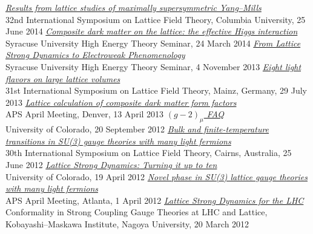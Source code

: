 \begin{spacelistout}
\begin{revnumerate}
    \pagebreakitem
      \textit{\href{http://www.davidschaich.net/talks/lattice14.pdf}{Results from lattice studies of maximally supersymmetric Yang--Mills}} \\
      32nd International Symposium on Lattice Field Theory, Columbia University, 25 June 2014
    \pagebreakitem
      \textit{\href{http://www.davidschaich.net/talks/LSD_SU4_1403.pdf}{Composite dark matter on the lattice: the effective Higgs interaction}} \\
      Syracuse University High Energy Theory Seminar, 24 March 2014
    \pagebreakitem
      \textit{\href{http://www.davidschaich.net/talks/LSD_EFT13.pdf}{From Lattice Strong Dynamics to Electroweak Phenomenology}} \\
      Syracuse University High Energy Theory Seminar, 4 November 2013
    \pagebreakitem
      \textit{\href{http://www.davidschaich.net/talks/lattice13.pdf}{Eight light flavors on large lattice volumes}} \\ %
      31st International Symposium on Lattice Field Theory, Mainz, Germany, 29 July 2013
    \pagebreakitem
      \textit{\href{http://www.davidschaich.net/talks/April13.pdf}{Lattice calculation of composite dark matter form factors}} \\
      APS April Meeting, Denver, 13 April 2013
    \pagebreakitem
      \textit{\href{http://www.davidschaich.net/talks/g-2_1209.pdf}{$(g - 2)_{\mu}$ FAQ}} \\
      University of Colorado, 20 September 2012
    \pagebreakitem
      \textit{\href{http://www.davidschaich.net/talks/lattice12.pdf}{Bulk and finite-temperature transitions in SU(3) gauge theories with many light fermions}} \\
      30th International Symposium on Lattice Field Theory, Cairns, Australia, 25 June 2012
    \pagebreakitem
      \textit{\href{http://www.davidschaich.net/talks/LSD10f_1204.pdf}{Lattice Strong Dynamics: Turning it up to ten}} \\
      University of Colorado, 19 April 2012
    \pagebreakitem
      \textit{\href{http://www.davidschaich.net/talks/April12}{Novel phase in SU(3) lattice gauge theories with many light fermions}} \\
      APS April Meeting, Atlanta, 1 April 2012
    \pagebreakitem
      \textit{\href{http://www.davidschaich.net/talks/SCGT12Mini.pdf}{Lattice Strong Dynamics for the LHC}} \\
      Conformality in Strong Coupling Gauge Theories at LHC and Lattice, \\ Kobayashi--Maskawa Institute, Nagoya University, 20 March 2012

\end{revnumerate}
\end{spacelistout}
